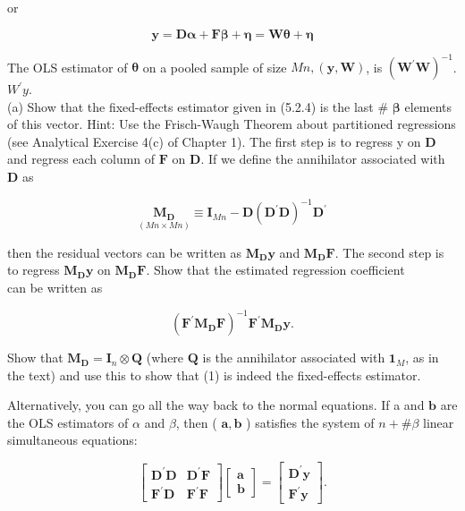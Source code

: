 \documentclass[10pt]{article}
\begin{document}
or


\begin{equation*}
\mathbf{y}=\mathbf{D} \boldsymbol{\alpha}+\mathbf{F} \boldsymbol{\beta}+\boldsymbol{\eta}=\mathbf{W} \boldsymbol{\theta}+\boldsymbol{\eta} \tag{3}
\end{equation*}


The OLS estimator of $\boldsymbol{\theta}$ on a pooled sample of size $M n,(\mathbf{y}, \mathbf{W})$, is $\left(\mathbf{W}^{\prime} \mathbf{W}\right)^{-1}$. $W^{\prime} y$.\\
(a) Show that the fixed-effects estimator given in (5.2.4) is the last \# $\boldsymbol{\beta}$ elements of this vector. Hint: Use the Frisch-Waugh Theorem about partitioned regressions (see Analytical Exercise 4(c) of Chapter 1). The first step is to regress y on $\mathbf{D}$ and regress each column of $\mathbf{F}$ on $\mathbf{D}$. If we define the annihilator associated with $\mathbf{D}$ as


\begin{equation*}
\underset{(M n \times M n)}{\mathbf{M}_{\mathbf{D}}} \equiv \mathbf{I}_{M n}-\mathbf{D}\left(\mathbf{D}^{\prime} \mathbf{D}\right)^{-1} \mathbf{D}^{\prime} \tag{4}
\end{equation*}


then the residual vectors can be written as $\mathbf{M}_{\mathbf{D}} \mathbf{y}$ and $\mathbf{M}_{\mathbf{D}} \mathbf{F}$. The second step is to regress $\mathbf{M}_{\mathbf{D}} \mathbf{y}$ on $\mathbf{M}_{\mathbf{D}} \mathbf{F}$. Show that the estimated regression coefficient\\
can be written as


\begin{equation*}
\left(\mathbf{F}^{\prime} \mathbf{M}_{\mathbf{D}} \mathbf{F}\right)^{-1} \mathbf{F}^{\prime} \mathbf{M}_{\mathbf{D}} \mathbf{y} . \tag{5}
\end{equation*}


Show that $\mathbf{M}_{\mathbf{D}}=\mathbf{I}_{n} \otimes \mathbf{Q}$ (where $\mathbf{Q}$ is the annihilator associated with $\mathbf{1}_{M}$, as in the text) and use this to show that (1) is indeed the fixed-effects estimator.

Alternatively, you can go all the way back to the normal equations. If a and $\mathbf{b}$ are the OLS estimators of $\alpha$ and $\beta$, then ( $\mathbf{a}, \mathbf{b}$ ) satisfies the system of $n+\# \beta$ linear simultaneous equations:

\[
\left[\begin{array}{cc}
\mathbf{D}^{\prime} \mathbf{D} & \mathbf{D}^{\prime} \mathbf{F}  \tag{6}\\
\mathbf{F}^{\prime} \mathbf{D} & \mathbf{F}^{\prime} \mathbf{F}
\end{array}\right]\left[\begin{array}{l}
\mathbf{a} \\
\mathbf{b}
\end{array}\right]=\left[\begin{array}{l}
\mathbf{D}^{\prime} \mathbf{y} \\
\mathbf{F}^{\prime} \mathbf{y}
\end{array}\right] .
\]
\end{document}
